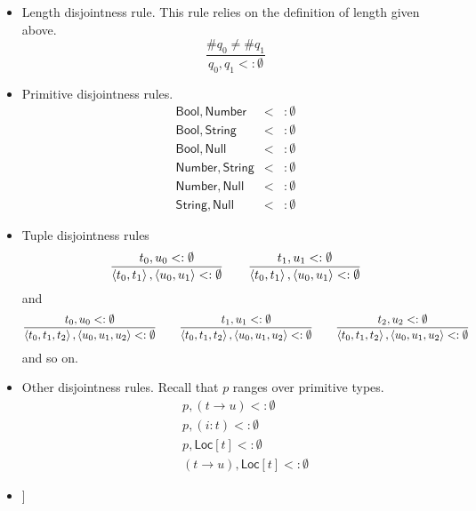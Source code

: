 \documentclass[12pt]{article}
\begin{document}
\begin{itemize}
\item Length disjointness rule. This rule relies on the definition of length
given above.%
\begin{equation*}
\frac{\#q_{0}\neq \#q_{1}}{q_{0},q_{1}<:\emptyset }
\end{equation*}

\item Primitive disjointness rules.%
\begin{eqnarray*}
\mathsf{Bool},\mathsf{Number} &<&:\emptyset \\
\mathsf{Bool},\mathsf{String} &<&:\emptyset \\
\mathsf{Bool},\mathsf{Null} &<&:\emptyset \\
\mathsf{Number},\mathsf{String} &<&:\emptyset \\
\mathsf{Number},\mathsf{Null} &<&:\emptyset \\
\mathsf{String},\mathsf{Null} &<&:\emptyset
\end{eqnarray*}

\item Tuple disjointness rules%
\begin{equation*}
\frac{t_{0},u_{0}<:\emptyset }{\left\langle t_{0},t_{1}\right\rangle
,\left\langle u_{0},u_{1}\right\rangle <:\emptyset }\qquad \frac{%
t_{1},u_{1}<:\emptyset }{\left\langle t_{0},t_{1}\right\rangle ,\left\langle
u_{0},u_{1}\right\rangle <:\emptyset }
\end{equation*}%
and%
\begin{equation*}
\frac{t_{0},u_{0}<:\emptyset }{\left\langle t_{0},t_{1},t_{2}\right\rangle
,\left\langle u_{0},u_{1},u_{2}\right\rangle <:\emptyset }\qquad \frac{%
t_{1},u_{1}<:\emptyset }{\left\langle t_{0},t_{1},t_{2}\right\rangle
,\left\langle u_{0},u_{1},u_{2}\right\rangle <:\emptyset }\qquad \frac{%
t_{2},u_{2}<:\emptyset }{\left\langle t_{0},t_{1},t_{2}\right\rangle
,\left\langle u_{0},u_{1},u_{2}\right\rangle <:\emptyset }
\end{equation*}%
and so on.

\item Other disjointness rules. Recall that $p$ ranges over primitive types.%
\begin{eqnarray*}
&&p,\left( t\rightarrow u\right) <:\emptyset \\
&&p,\left( i:t\right) <:\emptyset \\
&&p,\mathsf{Loc}[t]<:\emptyset \\
&&\left( t\rightarrow u\right) ,\mathsf{Loc}[t]<:\emptyset
\end{eqnarray*}

\item {}]
\end{itemize}
\end{document}
